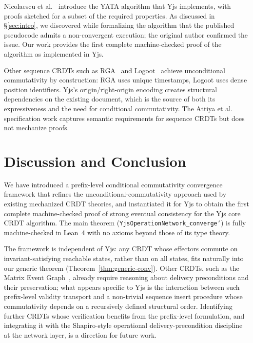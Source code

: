\documentclass[sigplan,screen]{acmart}
\newcommand{\leanref}[1]{\texttt{#1}}
\begin{document}
Nicolaescu et al.~\cite{Nicolaescu2016} introduce the YATA algorithm that
Yjs implements, with proofs sketched for a subset of the required
properties.  As discussed in \S\ref{sec:intro}, we discovered while
formalizing the algorithm that the published pseudocode admits a
non-convergent execution; the original author confirmed the issue.  Our
work provides the first complete machine-checked proof of the algorithm as
implemented in Yjs.

Other sequence CRDTs such as RGA~\cite{Roh2011} and Logoot~\cite{Weiss2010}
achieve unconditional commutativity by construction: RGA uses unique timestamps,
Logoot uses dense position identifiers.  Yjs's origin/right-origin encoding
creates structural dependencies on the existing document, which is the source
of both its expressiveness and the need for conditional commutativity.
The Attiya et al.~\cite{Attiya2016} specification work captures semantic
requirements for sequence CRDTs but does not mechanize proofs.

\section{Discussion and Conclusion}
\label{sec:conclusion}

We have introduced a prefix-level conditional commutativity convergence
framework that refines the unconditional-commutativity approach used by
existing mechanized CRDT theories, and instantiated it for Yjs to obtain
the first complete machine-checked proof of strong eventual consistency
for the Yjs core CRDT algorithm.  The main theorem
(\leanref{YjsOperationNetwork\_converge'}) is fully machine-checked in
Lean~4 with no axioms beyond those of its type theory.

The framework is independent of Yjs: any CRDT whose effectors commute
on invariant-satisfying reachable states, rather than on all states,
fits naturally into our generic theorem
(Theorem~\ref{thm:generic-conv}).
Other CRDTs, such as the Matrix Event Graph~\cite{MatrixEventGraph2022},
already require reasoning about delivery preconditions and their
preservation; what appears specific to Yjs is the interaction between
such prefix-level validity transport and a non-trivial sequence insert
procedure whose commutativity depends on a recursively defined
structural order.  Identifying further CRDTs whose verification benefits
from the prefix-level formulation, and integrating it with the
Shapiro-style operational delivery-precondition discipline at the network
layer, is a direction for future work.
\end{document}
